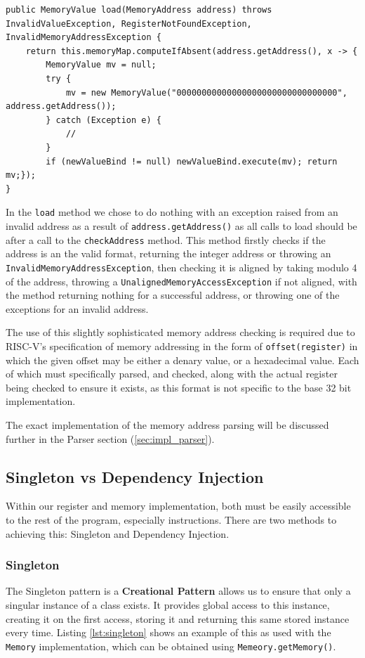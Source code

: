 \begin{lstlisting}[caption=Memory load method, label=lst:mem_load]
public MemoryValue load(MemoryAddress address) throws InvalidValueException, RegisterNotFoundException, InvalidMemoryAddressException {
    return this.memoryMap.computeIfAbsent(address.getAddress(), x -> {
        MemoryValue mv = null;
        try {
            mv = new MemoryValue("00000000000000000000000000000000", address.getAddress());
        } catch (Exception e) {
            //
        }
        if (newValueBind != null) newValueBind.execute(mv); return mv;});
}
\end{lstlisting}

In the \texttt{load} method we chose to do nothing with an exception raised from an invalid address as a result of \texttt{address.getAddress()} as all calls to load should be after a call to the \texttt{checkAddress} method. This method firstly checks if the address is an the valid format, returning the integer address or throwing an \texttt{InvalidMemoryAddressException}, then checking it is aligned by taking modulo 4 of the address, throwing a \texttt{UnalignedMemoryAccessException} if not aligned, with the method returning nothing for a successful address, or throwing one of the exceptions for an invalid address.

The use of this slightly sophisticated memory address checking is required due to RISC-V's specification of memory addressing in the form of \verb|offset(register)| in which the given offset may be either a denary value, or a hexadecimal value. Each of which must specifically parsed, and checked, along with the actual register being checked to ensure it exists, as this format is not specific to the base 32 bit implementation. 

The exact implementation of the memory address parsing will be discussed further in the Parser section (\ref{sec:impl_parser}).

\subsection{Singleton vs Dependency Injection}
Within our register and memory implementation, both must be easily accessible to the rest of the program, especially instructions. There are two methods to achieving this: Singleton and Dependency Injection.

\subsubsection{Singleton}
The Singleton pattern is a \textbf{Creational Pattern} allows us to ensure that only a singular instance of a class exists. It provides global access to this instance, creating it on the first access, storing it and returning this same stored instance every time. Listing \ref{lst:singleton} shows an example of this as used with the \texttt{Memory} implementation, which can be obtained using \verb|Memeory.getMemory()|.

